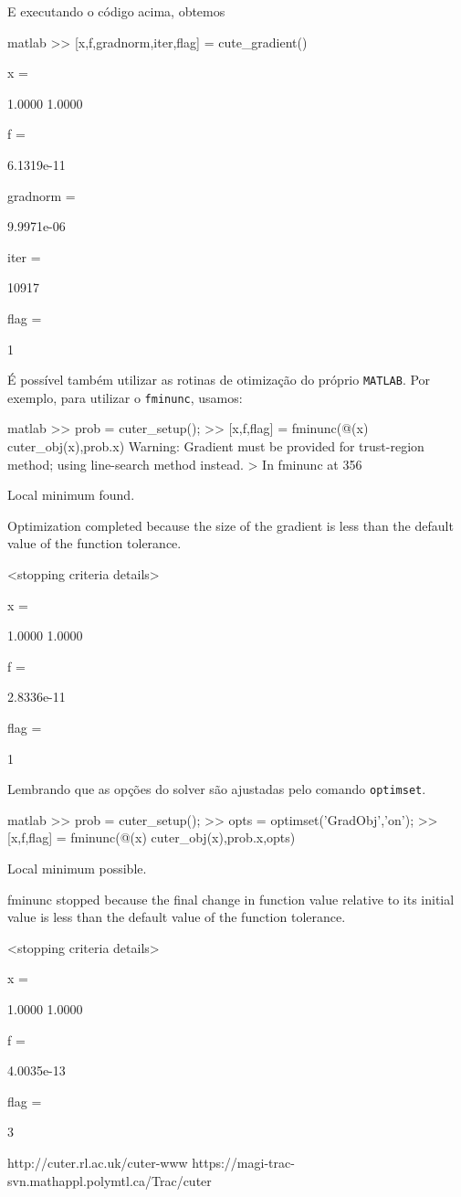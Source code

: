 \documentclass[letterpaper,11pt]{article}
\numberwithin{equation}{section}
\begin{document}
E executando o c\'odigo acima, obtemos
\begin{code}{matlab}
>> [x,f,gradnorm,iter,flag] = cute_gradient()

x =

    1.0000
    1.0000


f =

   6.1319e-11


gradnorm =

   9.9971e-06


iter =

       10917


flag =

     1
\end{code}

\'E poss\'ivel tamb\'em utilizar as rotinas de otimiza\c{c}\~ao do pr\'oprio {\tt MATLAB}. Por 
exemplo, para utilizar o {\tt fminunc}, usamos:
\begin{code}{matlab}
>> prob = cuter_setup();
>> [x,f,flag] = fminunc(@(x) cuter_obj(x),prob.x)
Warning: Gradient must be provided for trust-region method;
  using line-search method instead. 
> In fminunc at 356

Local minimum found.

Optimization completed because the size of the gradient is less than
the default value of the function tolerance.

<stopping criteria details>


x =

    1.0000
    1.0000


f =

   2.8336e-11


flag =

     1
\end{code}
Lembrando que as op\c{c}\~oes do solver s\~ao ajustadas pelo comando {\tt optimset}.
\begin{code}{matlab}
>> prob = cuter_setup();
>> opts = optimset('GradObj','on');
>> [x,f,flag] = fminunc(@(x) cuter_obj(x),prob.x,opts)

Local minimum possible.

fminunc stopped because the final change in function value relative to 
its initial value is less than the default value of the function tolerance.

<stopping criteria details>


x =

    1.0000
    1.0000


f =

   4.0035e-13


flag =

     3
\end{code}
% 


\begin{thebibliography}{3}
 http://cuter.rl.ac.uk/cuter-www 
 https://magi-trac-svn.mathappl.polymtl.ca/Trac/cuter 
\end{thebibliography}
\end{document}
